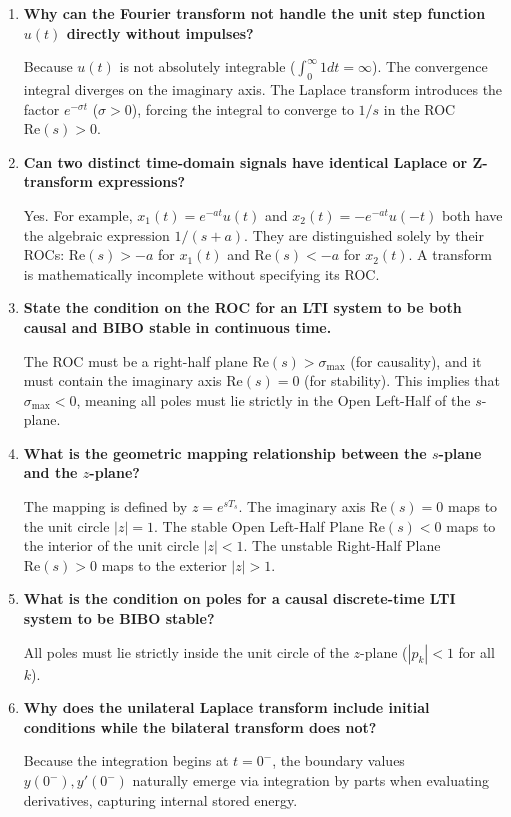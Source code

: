 \documentclass[12pt,a4paper]{article}
\newcommand{\Q}[1]{\textbf{#1}\par\noindent\ignorespaces}
\begin{document}
\begin{tcolorbox}[exambox, title={\textbf{Frequently Asked / Viva Questions}}]
\begin{enumerate}[topsep=0pt, label=\textbf{Q\arabic*.}, itemsep=5pt]
  \item \Q{Why can the Fourier transform not handle the unit step function $u(t)$ directly without impulses?}
  Because $u(t)$ is not absolutely integrable ($\int_0^\infty 1 dt = \infty$). The convergence integral diverges on the imaginary axis. The Laplace transform introduces the factor $e^{-\sigma t}$ ($\sigma > 0$), forcing the integral to converge to $1/s$ in the ROC $\text{Re}(s) > 0$.

  \item \Q{Can two distinct time-domain signals have identical Laplace or Z-transform expressions?}
  Yes. For example, $x_1(t) = e^{-at}u(t)$ and $x_2(t) = -e^{-at}u(-t)$ both have the algebraic expression $1/(s+a)$. They are distinguished solely by their ROCs: $\text{Re}(s) > -a$ for $x_1(t)$ and $\text{Re}(s) < -a$ for $x_2(t)$. A transform is mathematically incomplete without specifying its ROC.

  \item \Q{State the condition on the ROC for an LTI system to be both causal and BIBO stable in continuous time.}
  The ROC must be a right-half plane $\text{Re}(s) > \sigma_{\max}$ (for causality), and it must contain the imaginary axis $\text{Re}(s) = 0$ (for stability). This implies that $\sigma_{\max} < 0$, meaning all poles must lie strictly in the Open Left-Half of the $s$-plane.

  \item \Q{What is the geometric mapping relationship between the $s$-plane and the $z$-plane?}
  The mapping is defined by $z = e^{s T_s}$. The imaginary axis $\text{Re}(s) = 0$ maps to the unit circle $|z| = 1$. The stable Open Left-Half Plane $\text{Re}(s) < 0$ maps to the interior of the unit circle $|z| < 1$. The unstable Right-Half Plane $\text{Re}(s) > 0$ maps to the exterior $|z| > 1$.

  \item \Q{What is the condition on poles for a causal discrete-time LTI system to be BIBO stable?}
  All poles must lie strictly inside the unit circle of the $z$-plane ($|p_k| < 1$ for all $k$).

  \item \Q{Why does the unilateral Laplace transform include initial conditions while the bilateral transform does not?}
  Because the integration begins at $t = 0^-$, the boundary values $y(0^-), y'(0^-)$ naturally emerge via integration by parts when evaluating derivatives, capturing internal stored energy.


\end{enumerate}
\end{tcolorbox}
\end{document}
